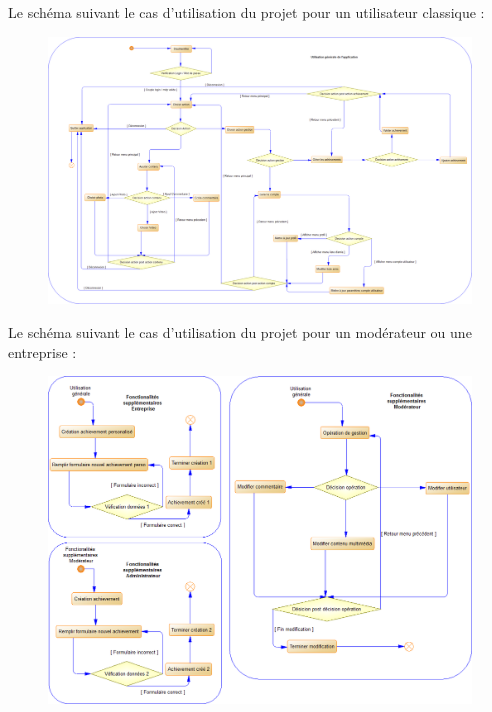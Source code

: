 \documentclass{life-fr}
\begin{document}
Le schéma suivant le cas d'utilisation du projet pour un utilisateur classique :
\begin{figure}[H]
  \begin{center}
    \includegraphics[width=17cm]{img/processus_principaux_2.png}
  \end{center}
\end{figure}

\newpage

Le schéma suivant le cas d'utilisation du projet pour un modérateur ou une entreprise :
\begin{figure}[H]
  \begin{center}
    \includegraphics[width=17cm]{img/processus_principaux_1.png}
  \end{center}
\end{figure}
\end{document}
